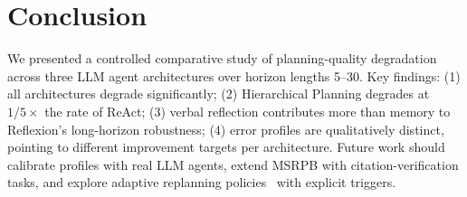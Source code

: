 \documentclass[conference]{IEEEtran}
\begin{document}
\section{Conclusion}

We presented a controlled comparative study of planning-quality degradation
across three LLM agent architectures over horizon lengths 5--30. Key findings:
(1) all architectures degrade significantly; (2) Hierarchical Planning degrades
at $1/5\times$ the rate of ReAct; (3) verbal reflection contributes more than
memory to Reflexion's long-horizon robustness; (4) error profiles are
qualitatively distinct, pointing to different improvement targets per
architecture. Future work should calibrate profiles with real LLM agents,
extend MSRPB with citation-verification tasks, and explore adaptive replanning
policies~\cite{yao2026arc} with explicit triggers.
\end{document}
